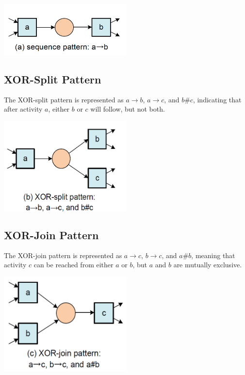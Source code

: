     \begin{center}
        \includegraphics[width=0.5\textwidth]{capitolo 5/5 sequence pattern.png}
    \end{center}
    
    \subsection{XOR-Split Pattern}
    The XOR-split pattern is represented as \(a \rightarrow b\), \(a \rightarrow c\), and \(b \# c\), indicating that after activity \(a\), either \(b\) or \(c\) will follow, but not both.
    
    \begin{center}
        \includegraphics[width=0.5\textwidth]{capitolo 5/5 xor split.png}
    \end{center}
    
    \subsection{XOR-Join Pattern}
    The XOR-join pattern is represented as \(a \rightarrow c\), \(b \rightarrow c\), and \(a \# b\), meaning that activity \(c\) can be reached from either \(a\) or \(b\), but \(a\) and \(b\) are mutually exclusive.
    
    \begin{center}
        \includegraphics[width=0.5\textwidth]{capitolo 5/5 xor join.png}
    \end{center}
    

